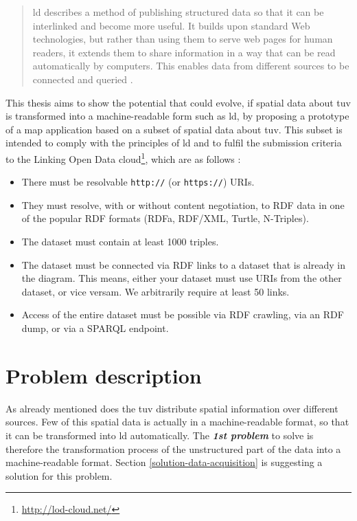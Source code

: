 \documentclass[draft,final]{vutinfth} %
\begin{document}
\begin{quote} \gls{ld} describes a method of publishing structured data so that it can be interlinked and become more useful. It builds upon standard Web technologies, but rather than using them to serve web pages for human readers, it extends them to share information in a way that can be read automatically by computers. This enables data from different sources to be connected and queried
\cite{bizer_linked_2009}.\end{quote}

This thesis aims to show the potential that could evolve, if spatial data about \gls{tuv} is transformed into a machine-readable form such as \gls{ld}, by proposing a prototype of a map application based on a subset of spatial data about \gls{tuv}. This subset is intended to comply with the principles of \gls{ld} \cite{berners-lee_linked_2009} and to fulfil the submission criteria to the Linking Open Data cloud\footnote{\url{http://lod-cloud.net/}}, which are as follows \cite{cyganiak_linking_2011}:

\begin{itemize}
	\item There must be resolvable \texttt{http://} (or \texttt{https://}) URIs.
	\item They must resolve, with or without content negotiation, to RDF data in one of the popular RDF formats (RDFa, RDF/XML, Turtle, N-Triples).
	\item The dataset must contain at least 1000 triples.
	\item The dataset must be connected via RDF links to a dataset that is already in the diagram. This means, either your dataset must use URIs from the other dataset, or vice versam. We arbitrarily require at least 50 links.
	\item Access of the entire dataset must be possible via RDF crawling, via an RDF dump, or via a SPARQL endpoint.
\end{itemize}


\section{Problem description}
\label{intro-problem-description}

As already mentioned does the \gls{tuv} distribute spatial information over different sources. Few of this spatial data is actually in a machine-readable format, so that it can be transformed into \gls{ld} automatically. The \textbf{\textit{1st problem}} to solve is therefore the transformation process of the unstructured part of the data into a machine-readable format. Section \ref{solution-data-acquisition} is suggesting a solution for this problem.
\end{document}
